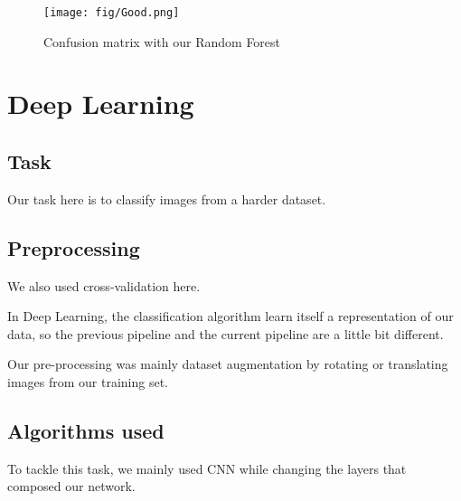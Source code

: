 \documentclass[12pt,a4paper]{article}
\begin{document}
\begin{figure}[h]
\centering
\texttt{[image: fig/Good.png]}
\caption{Confusion matrix with our Random Forest}
\end{figure}

\section{Deep Learning}

\subsection{Task}
Our task here is to classify images from a harder dataset.

\subsection{Preprocessing}
We also used cross-validation here.

In Deep Learning, the classification algorithm learn itself a representation of our data, so the previous pipeline and the current pipeline are a little bit different.

Our pre-processing was mainly dataset augmentation by rotating or translating images from our training set.

\subsection{Algorithms used}
To tackle this task, we mainly used CNN while changing the layers that composed our network.
\end{document}
